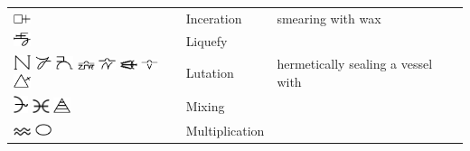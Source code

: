 \documentclass[british,final,landscape]{scrartcl}
\begin{document}
\begin{refsection}
\begin{supertabular}{p{0.3\textwidth}p{0.34\textwidth}p{0.34\textwidth}}
   \includegraphics[width=5mm]{Process/Inceration} & Inceration & smearing with wax \\
   \includegraphics[width=5mm]{Process/Liquefy} & Liquefy & \\
   \includegraphics[width=5mm]{Process/Lutation} \includegraphics[width=5mm]{Process/Lutation2} \includegraphics[width=5mm]{Process/Lutation3} \includegraphics[width=5mm]{Process/Lutation4} \includegraphics[width=5mm]{Process/Lutation5} \includegraphics[width=5mm]{Process/Lutation6} \includegraphics[width=5mm]{Process/Lutation7} \includegraphics[width=5mm]{Process/Lutation8} & Lutation & hermetically sealing a vessel with  \\
   \includegraphics[height=5mm]{Process/Mixing} \includegraphics[width=5mm]{Process/Mixing2} \includegraphics[width=5mm]{Process/Mixing3} & Mixing & \\
   \includegraphics[width=5mm]{Process/Multiplication} \includegraphics[width=5mm]{Process/Multiplication2} & Multiplication & \\

\end{supertabular}
\end{refsection}
\end{document}
